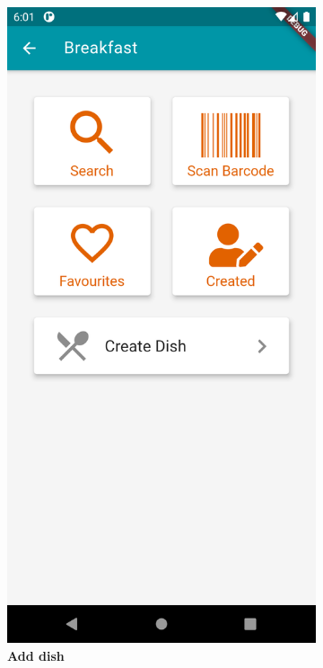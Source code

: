 \documentclass [12pt]{article}
\begin{document}
\begin{description}[leftmargin=1cm,rightmargin=1cm]
\begin{figure}[h!]
\begin{subfigure}[tl]{0.3\linewidth}
\includegraphics[width=\linewidth]{addDish1.PNG}
\caption{\textbf{Add dish}}
\end{subfigure}\hfill
\begin{subfigure}[tr]{0.3\linewidth}

\end{subfigure}
\end{figure}
\end{description}
\end{document}

